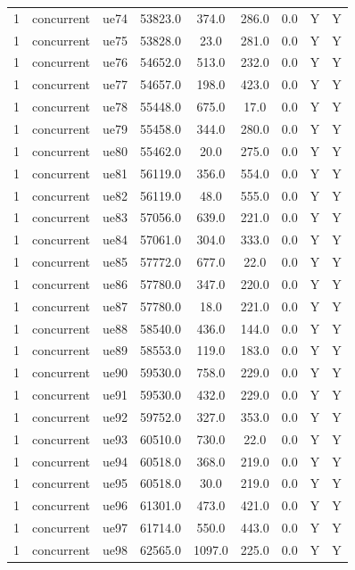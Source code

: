 \begin{table}[ht]
\begin{tabular}{|c|c|c|c|c|c|c|c|c|}
1 & concurrent & ue74 & 53823.0 & 374.0 & 286.0 & 0.0 & Y & Y \\
1 & concurrent & ue75 & 53828.0 & 23.0 & 281.0 & 0.0 & Y & Y \\
1 & concurrent & ue76 & 54652.0 & 513.0 & 232.0 & 0.0 & Y & Y \\
1 & concurrent & ue77 & 54657.0 & 198.0 & 423.0 & 0.0 & Y & Y \\
1 & concurrent & ue78 & 55448.0 & 675.0 & 17.0 & 0.0 & Y & Y \\
1 & concurrent & ue79 & 55458.0 & 344.0 & 280.0 & 0.0 & Y & Y \\
1 & concurrent & ue80 & 55462.0 & 20.0 & 275.0 & 0.0 & Y & Y \\
1 & concurrent & ue81 & 56119.0 & 356.0 & 554.0 & 0.0 & Y & Y \\
1 & concurrent & ue82 & 56119.0 & 48.0 & 555.0 & 0.0 & Y & Y \\
1 & concurrent & ue83 & 57056.0 & 639.0 & 221.0 & 0.0 & Y & Y \\
1 & concurrent & ue84 & 57061.0 & 304.0 & 333.0 & 0.0 & Y & Y \\
1 & concurrent & ue85 & 57772.0 & 677.0 & 22.0 & 0.0 & Y & Y \\
1 & concurrent & ue86 & 57780.0 & 347.0 & 220.0 & 0.0 & Y & Y \\
1 & concurrent & ue87 & 57780.0 & 18.0 & 221.0 & 0.0 & Y & Y \\
1 & concurrent & ue88 & 58540.0 & 436.0 & 144.0 & 0.0 & Y & Y \\
1 & concurrent & ue89 & 58553.0 & 119.0 & 183.0 & 0.0 & Y & Y \\
1 & concurrent & ue90 & 59530.0 & 758.0 & 229.0 & 0.0 & Y & Y \\
1 & concurrent & ue91 & 59530.0 & 432.0 & 229.0 & 0.0 & Y & Y \\
1 & concurrent & ue92 & 59752.0 & 327.0 & 353.0 & 0.0 & Y & Y \\
1 & concurrent & ue93 & 60510.0 & 730.0 & 22.0 & 0.0 & Y & Y \\
1 & concurrent & ue94 & 60518.0 & 368.0 & 219.0 & 0.0 & Y & Y \\
1 & concurrent & ue95 & 60518.0 & 30.0 & 219.0 & 0.0 & Y & Y \\
1 & concurrent & ue96 & 61301.0 & 473.0 & 421.0 & 0.0 & Y & Y \\
1 & concurrent & ue97 & 61714.0 & 550.0 & 443.0 & 0.0 & Y & Y \\
1 & concurrent & ue98 & 62565.0 & 1097.0 & 225.0 & 0.0 & Y & Y \\

\end{tabular}
\end{table}
